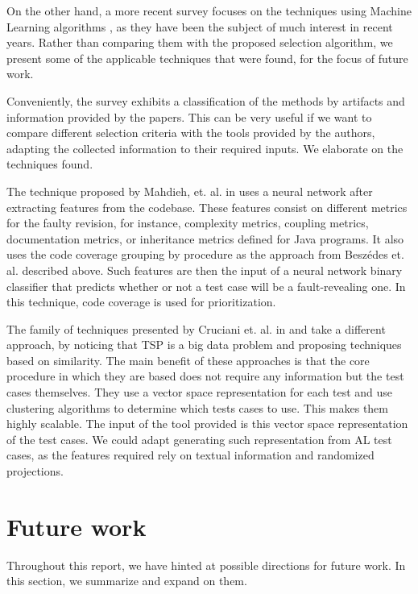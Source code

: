 \documentclass{article}
\begin{document}
On the other hand, a more recent survey focuses on the techniques using Machine Learning algorithms \cite{Pan2021TestCS}, as they have been the subject of much interest in recent years. Rather than comparing them with the proposed selection algorithm, we present some of the applicable techniques that were found, for the focus of future work.

Conveniently, the survey exhibits a classification of the methods by artifacts and information provided by the papers. This can be very useful if we want to compare different selection criteria with the tools provided by the authors, adapting the collected information to their required inputs. We elaborate on the techniques found.

The technique proposed by Mahdieh, et. al. in \cite{MAHDIEH2020106269} uses a neural network after extracting features from the codebase. These features consist on different metrics for the faulty revision, for instance, complexity metrics, coupling metrics, documentation metrics, or inheritance metrics defined for Java programs. It also uses the code coverage grouping by procedure as the approach from Beszédes et. al. described above. Such features are then the input of a neural network binary classifier that predicts whether or not a test case will be a fault-revealing one. In this technique, code coverage is used for prioritization.

The family of techniques presented by Cruciani et. al. in \cite{10.1109/ICSE.2019.00055} and \cite{10.1145/3180155.3180210} take a different approach, by noticing that TSP is a big data problem and proposing techniques based on similarity. The main benefit of these approaches is that the core procedure in which they are based does not require any information but the test cases themselves. They use a vector space representation for each test and use clustering algorithms to determine which tests cases to use. This makes them highly scalable. The input of the tool provided is this vector space representation of the test cases. We could adapt generating such representation from AL test cases, as the features required rely on textual information and randomized projections.

\section{Future work}\label{section:future-work}
Throughout this report, we have hinted at possible directions for future work. In this section, we summarize and expand on them. 
\end{document}
